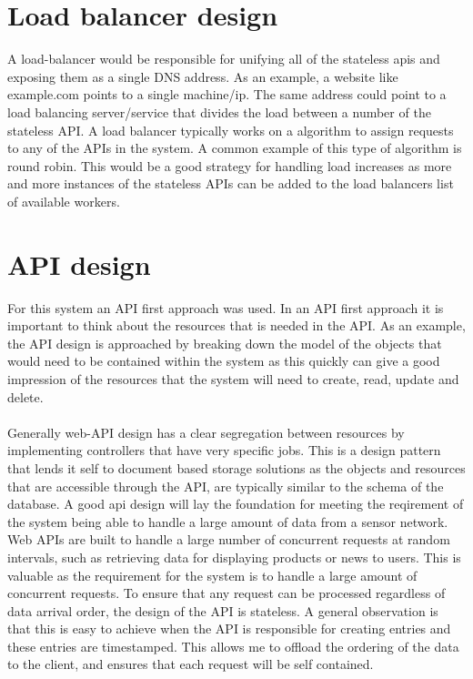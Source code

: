 \documentclass[]{uiophd}
\begin{document}
\section{Load balancer design}
A load-balancer would be responsible for unifying all of the stateless apis and exposing them as a single DNS address. As an example, a website like example.com points to a single machine/ip. The same address could point to a load balancing server/service that divides the load between a number of the stateless API. A load balancer typically works on a algorithm to assign requests to any of the APIs in the system. A common example of this type of algorithm is round robin. This would be a good strategy for handling load increases as more and more instances of the stateless APIs can be added to the load balancers list of available workers.

\section{API design}
For this system an API first approach was used. In an API first approach it is important to think about the resources that is needed in the API. As an example, the API design is approached by breaking down the model of the objects that would need to be contained within the system as this quickly can give a good impression of the resources that the system will need to create, read, update and delete. 
\\\\
Generally web-API design has a clear segregation between resources by implementing controllers that have very specific jobs. This is a design pattern that lends it self to document based storage solutions as the objects and resources that are accessible through the API, are typically similar to the schema of the database. A good api design will lay  the foundation for meeting the reqirement of the system being able to handle a large amount of data from a sensor network. Web APIs are built to handle a large number of concurrent requests at random intervals, such as retrieving data for displaying products or news to users. This is valuable as the requirement for the system is to handle a large amount of concurrent requests. To ensure that any request can be processed regardless of data arrival order, the design of the API is stateless. A general observation is that this is easy to achieve when the API is responsible for creating entries and these entries are timestamped. This allows me to offload the ordering of the data to the client, and ensures that each request will be self contained.
\end{document}
